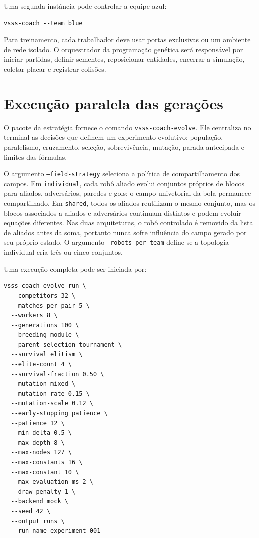\documentclass[12pt,a4paper]{article}
\begin{document}
Uma segunda inst\^ancia pode controlar a equipe azul:

\begin{verbatim}
vsss-coach --team blue
\end{verbatim}

Para treinamento, cada trabalhador deve usar portas exclusivas ou um ambiente de rede isolado. O orquestrador da programa\c{c}\~ao gen\'etica ser\'a respons\'avel por iniciar partidas, definir sementes, reposicionar entidades, encerrar a simula\c{c}\~ao, coletar placar e registrar colis\~oes.

\section{Execu\c{c}\~ao paralela das gera\c{c}\~oes}

O pacote da estrat\'egia fornece o comando \texttt{vsss-coach-evolve}. Ele centraliza no terminal as decis\~oes que definem um experimento evolutivo: popula\c{c}\~ao, paralelismo, cruzamento, sele\c{c}\~ao, sobreviv\^encia, muta\c{c}\~ao, parada antecipada e limites das f\'ormulas.

O argumento \texttt{--field-strategy} seleciona a pol\'itica de compartilhamento dos campos. Em \texttt{individual}, cada rob\^o aliado evolui conjuntos pr\'oprios de blocos para aliados, advers\'arios, paredes e gols; o campo univetorial da bola permanece compartilhado. Em \texttt{shared}, todos os aliados reutilizam o mesmo conjunto, mas os blocos associados a aliados e advers\'arios continuam distintos e podem evoluir equa\c{c}\~oes diferentes. Nas duas arquiteturas, o rob\^o controlado \'e removido da lista de aliados antes da soma, portanto nunca sofre influ\^encia do campo gerado por seu pr\'oprio estado. O argumento \texttt{--robots-per-team} define se a topologia individual cria tr\^es ou cinco conjuntos.

Uma execu\c{c}\~ao completa pode ser iniciada por:

\begin{verbatim}
vsss-coach-evolve run \
  --competitors 32 \
  --matches-per-pair 5 \
  --workers 8 \
  --generations 100 \
  --breeding module \
  --parent-selection tournament \
  --survival elitism \
  --elite-count 4 \
  --survival-fraction 0.50 \
  --mutation mixed \
  --mutation-rate 0.15 \
  --mutation-scale 0.12 \
  --early-stopping patience \
  --patience 12 \
  --min-delta 0.5 \
  --max-depth 8 \
  --max-nodes 127 \
  --max-constants 16 \
  --max-constant 10 \
  --max-evaluation-ms 2 \
  --draw-penalty 1 \
  --backend mock \
  --seed 42 \
  --output runs \
  --run-name experiment-001
\end{verbatim}
\end{document}
